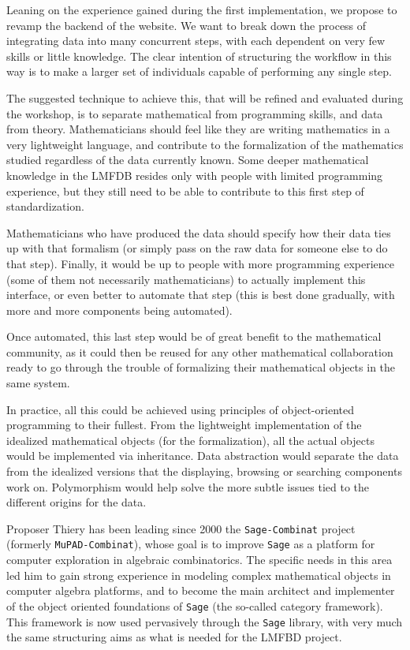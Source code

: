 \documentclass{article}
\begin{document}
Leaning on the experience gained during the first implementation, we propose to revamp the backend of the website. We want to break down the process of integrating data into many concurrent steps, with each dependent on very few skills or little knowledge. The clear intention of structuring the workflow in this way is to make a larger set of individuals capable of performing any single step. 

The suggested technique to achieve this, that will be refined and evaluated during the workshop, is to separate mathematical from programming skills, and data from theory. Mathematicians should feel like they are writing mathematics in a very lightweight language, and contribute to the formalization of the mathematics studied regardless of the data currently known. Some deeper mathematical knowledge in the LMFDB resides only with people with limited programming experience, but they still need to be able to contribute to this first step of standardization. 

Mathematicians who have produced the data should specify how their data ties up with that formalism (or simply pass on the raw data for someone else to do that step). Finally, it would be up to people with more programming experience (some of them not necessarily mathematicians) to actually implement this interface, or even better to automate that step (this is best done gradually, with more and more components being automated). 

Once automated, this last step would be of great benefit to the mathematical community, as it could then be reused for any other mathematical collaboration ready to go through the trouble of formalizing their mathematical objects in the same system. 

In practice, all this could be achieved using principles of object-oriented programming to their fullest. From the lightweight implementation of the idealized mathematical objects (for the formalization), all the actual objects would be implemented via inheritance. Data abstraction would separate the data from the idealized versions that the displaying, browsing or searching components work on. Polymorphism would help solve the more subtle issues tied to the different origins for the data. 

Proposer Thiery has been leading since 2000 the
\texttt{Sage-Combinat} project (formerly \texttt{MuPAD-Combinat}),
whose goal is to improve \texttt{Sage} as a platform for computer
exploration in algebraic combinatorics. The specific needs in this
area led him to gain strong experience in modeling complex
mathematical objects in computer algebra platforms, and to become the
main architect and implementer of the object oriented foundations of
\texttt{Sage} (the so-called category framework). This framework is
now used pervasively through the \texttt{Sage} library, with very much
the same structuring aims as what is needed for the LMFBD project.
\end{document}
